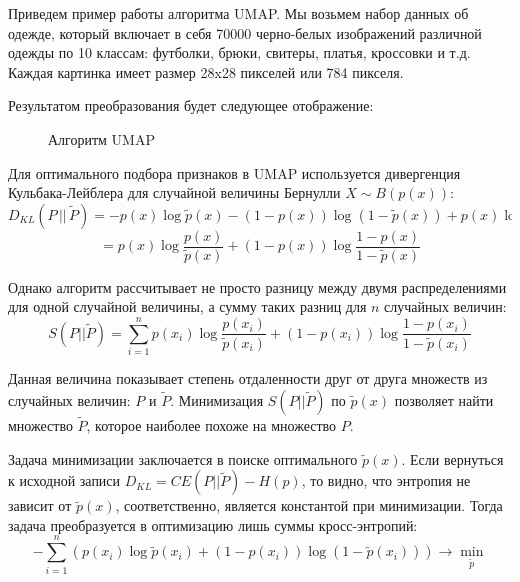 \documentclass[final]{beamer}
\newlength{\onecolwid}
\begin{document}
\begin{frame}[t]
\begin{columns}[t]
\begin{column}{\onecolwid}
Приведем пример работы алгоритма UMAP. Мы возьмем набор данных об одежде, который включает в себя 70000 черно-белых изображений различной одежды по 10 классам: футболки, брюки, свитеры, платья, кроссовки и т.д. Каждая картинка имеет размер 28x28 пикселей или 784 пикселя.

Результатом преобразования будет следующее отображение:

\begin{figure}[!h]
	\noindent{}
	\caption{Алгоритм UMAP}
	\label{figCurves}
\end{figure} 

Для оптимального подбора признаков в UMAP используется дивергенция Кульбака-Лейблера для случайной величины Бернулли $X \sim B(p(x))$:
\[D_{KL}(P\, ||\, \tilde P)= - p(x)\log \tilde p(x) - (1 - p(x))\log (1 - \tilde p(x)) + p(x)\log p(x) + (1 - p(x))\log (1 - p(x)) = \]
\[= p(x)\log \frac{p(x)}{\tilde p(x)} + (1 - p(x))\log \frac{1 - p(x)}{1 - \tilde p(x)}\]

Однако алгоритм рассчитывает не просто разницу между двумя распределениями для одной случайной величины, а сумму таких разниц для $n$ случайных величин:
\[S(P||\tilde P) = \sum_{i=1}^n p(x_i)\log \frac{p(x_i)}{\tilde p(x_i)} + (1 - p(x_i))\log \frac{1 - p(x_i)}{1 - \tilde p(x_i)}\]

Данная величина показывает степень отдаленности друг от друга множеств из случайных величин: $P$ и $\tilde P$. Минимизация $S(P||\tilde P)$ по $\tilde p(x)$ позволяет найти множество $\tilde P$, которое наиболее похоже на множество $P$.

Задача минимизации заключается в поиске оптимального $\tilde p(x)$. Если вернуться к исходной записи $D_{KL} = CE(P||\tilde P) - H(p)$, то видно, что энтропия не зависит от $\tilde p(x)$, соответственно, является константой при минимизации. Тогда задача преобразуется в оптимизацию лишь суммы кросс-энтропий:
\[- \sum_{i=1}^n \left(p(x_i)\log \tilde p(x_i) + (1 - p(x_i))\log (1 - \tilde p(x_i))\right) \rightarrow \min_{\tilde p}\]


\end{column}
\end{columns}
\end{frame}
\end{document}
